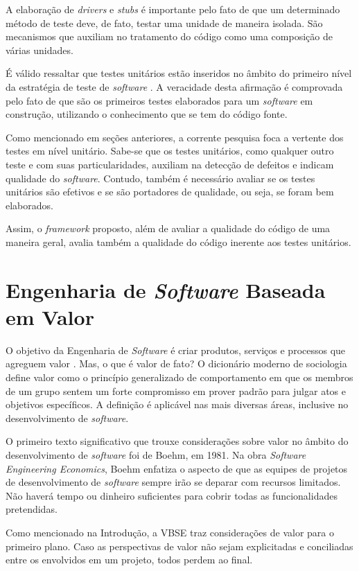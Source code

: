 A elaboração de \textit{drivers} e \textit{stubs} é importante pelo fato de que um determinado método de teste deve, de fato, testar uma unidade de maneira isolada. São mecanismos que auxiliam no tratamento do código como uma composição de várias unidades.

É válido ressaltar que testes unitários estão inseridos no âmbito do primeiro nível da estratégia de teste de \textit{software} \cite{nasa}. A veracidade desta afirmação é comprovada pelo fato de que são os primeiros testes elaborados para um \textit{software} em construção, utilizando o conhecimento que se tem do código fonte.

Como mencionado em seções anteriores, a corrente pesquisa foca a vertente dos testes em nível unitário. Sabe-se que os testes unitários, como qualquer outro teste e com suas particularidades, auxiliam na detecção de defeitos e indicam qualidade do \textit{software}. Contudo, também é necessário avaliar se os testes unitários são efetivos e se são portadores de qualidade, ou seja, se foram bem elaborados.

Assim, o \textit{framework} proposto, além de avaliar a qualidade do código de uma maneira geral, avalia também a qualidade do código inerente aos testes unitários.

\section {Engenharia de \textit{Software} Baseada em Valor}

O objetivo da Engenharia de \textit{Software} é criar produtos, serviços e processos que agreguem valor \cite{vbse1}. Mas, o que é valor de fato? O dicionário moderno de sociologia define valor como o princípio generalizado de comportamento em que os membros de um grupo sentem um forte compromisso em prover padrão para julgar atos e objetivos específicos. A definição é aplicável nas mais diversas áreas, inclusive no desenvolvimento de \textit{software}.

O primeiro texto significativo que trouxe considerações sobre valor no âmbito do desenvolvimento de \textit{software} foi de Boehm, em 1981. Na obra \textit{Software Engineering Economics}, Boehm enfatiza o aspecto de que as equipes de projetos de desenvolvimento de \textit{software} sempre irão se deparar com recursos limitados. Não haverá tempo ou dinheiro suficientes para cobrir todas as funcionalidades pretendidas.

Como mencionado na Introdução, a VBSE traz considerações de valor para o primeiro plano. Caso as perspectivas de valor não sejam explicitadas e conciliadas entre os envolvidos em um projeto, todos perdem ao final.

